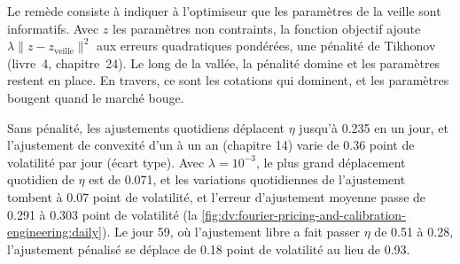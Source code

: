 Le remède consiste à indiquer à l'optimiseur que les paramètres de la veille sont informatifs. Avec $z$ les paramètres non contraints, la fonction objectif ajoute
$\lambda\lVert z-z_{\text{veille}}\rVert^2$ aux erreurs quadratiques pondérées, une pénalité de Tikhonov (livre~4, chapitre~24). Le long de la vallée, la
pénalité domine et les paramètres restent en place. En travers, ce sont les cotations qui dominent, et les paramètres bougent quand le marché bouge.

\begin{example}\label{ex:dv:fourier-pricing-and-calibration-engineering:daily}
Sans pénalité, les ajustements quotidiens déplacent $\eta$ jusqu'à 0.235 en un jour, et l'ajustement de convexité d'un  à un an (chapitre 14)
varie de 0.36 point de volatilité par jour (écart type). Avec $\lambda=10^{-3}$, le plus grand déplacement quotidien de $\eta$ est de 0.071, et les
variations quotidiennes de l'ajustement tombent à 0.07 point de volatilité, et l'erreur d'ajustement moyenne passe de 0.291 à 0.303 point de volatilité
(la \cref{fig:dv:fourier-pricing-and-calibration-engineering:daily}). Le jour 59, où l'ajustement libre a fait passer $\eta$ de 0.51 à 0.28, l'ajustement
pénalisé se déplace de 0.18 point de volatilité au lieu de 0.93.
\end{example}

